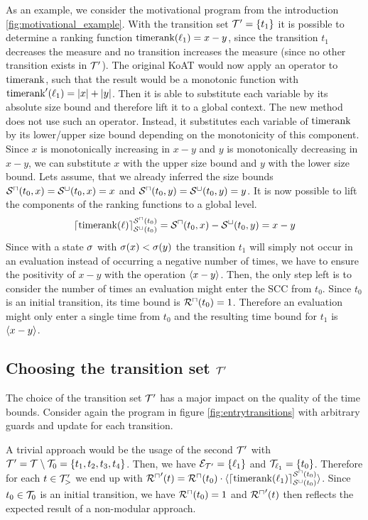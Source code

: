 As an example, we consider the motivational program from the introduction \ref{fig:motivational_example}.
With the transition set $\mathcal{T}' = \lbrace t_1 \rbrace$ it is possible to determine a ranking function $\text{timerank}(\ell_1) = x - y$, since the transition $t_1$ decreases the measure and no transition increases the measure (since no other transition exists in $\mathcal{T}'$).
The original KoAT would now apply an operator to $\text{timerank}$, such that the result would be a monotonic function with $\text{timerank}'(\ell_1) = \left|x\right| + \left|y\right|$.
Then it is able to substitute each variable by its absolute size bound and therefore lift it to a global context.
The new method does not use such an operator.
Instead, it substitutes each variable of $\text{timerank}$ by its lower/upper size bound depending on the monotonicity of this component.
Since $x$ is monotonically increasing in $x-y$ and $y$ is monotonically decreasing in $x-y$, we can substitute $x$ with the upper size bound and $y$ with the lower size bound.
Lets assume, that we already inferred the size bounds ${\mathcal{S}^\sqcap}(t_0,x) = {\mathcal{S}^\sqcup}(t_0,x) = x$ and ${\mathcal{S}^\sqcap}(t_0,y) = {\mathcal{S}^\sqcup}(t_0,y) = y$.
It is now possible to lift the components of the ranking functions to a global level.
\[ \lceil \text{timerank}(\ell) \rceil^{{\mathcal{S}^\sqcap}(t_0)}_{{\mathcal{S}^\sqcup}(t_0)} = {\mathcal{S}^\sqcap}(t_0, x) - {\mathcal{S}^\sqcup}(t_0, y) = x - y \]
Since with a state $\sigma$ with $\sigma(x) < \sigma(y)$ the transition $t_1$ will simply not occur in an evaluation instead of occurring a negative number of times, we have to ensure the positivity of $x - y$ with the operation $\langle x - y\rangle$.
Then, the only step left is to consider the number of times an evaluation might enter the SCC from $t_0$.
Since $t_0$ is an initial transition, its time bound is ${\mathcal{R}^\sqcap}(t_0) = 1$.
Therefore an evaluation might only enter a single time from $t_0$ and the resulting time bound for $t_1$ is $\langle x - y\rangle$.

\subsection{Choosing the transition set $\mathcal{T}'$}

The choice of the transition set $\mathcal{T}'$ has a major impact on the quality of the time bounds.
Consider again the program in figure \ref{fig:entrytransitions} with arbitrary guards and update for each transition.

A trivial approach would be the usage of the second $\mathcal{T}'$ with $\mathcal{T}' = \mathcal{T} \setminus \mathcal{T}_0 = \lbrace t_1, t_2, t_3, t_4 \rbrace$.
Then, we have $\mathcal{E}_{\mathcal{T}'} = \lbrace \ell_1 \rbrace$ and $\mathcal{T}_{\ell_1} = \lbrace t_0 \rbrace$.
Therefore for each $t \in \mathcal{T}'_>$ we end up with ${\mathcal{R}^\sqcap}'(t) = {\mathcal{R}^\sqcap}(t_0) \cdot \langle\lceil \text{timerank}(\ell_1) \rceil^{{\mathcal{S}^\sqcap}(t_0)}_{{\mathcal{S}^\sqcup}(t_0)}\rangle$.
Since $t_0 \in \mathcal{T}_0$ is an initial transition, we have ${\mathcal{R}^\sqcap}(t_0) = 1$ and ${\mathcal{R}^\sqcap}'(t)$ then reflects the expected result of a non-modular approach.

